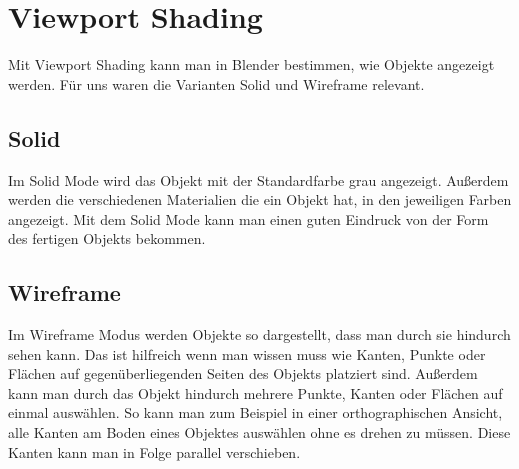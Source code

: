 \section{Viewport Shading}
Mit Viewport Shading kann man in Blender bestimmen, wie Objekte angezeigt werden. Für uns waren die Varianten Solid und Wireframe relevant.

\subsection{Solid}
Im Solid Mode wird das Objekt mit der Standardfarbe grau angezeigt.\citep{viewportshading:link} Außerdem werden die verschiedenen Materialien die ein Objekt
hat, in den jeweiligen Farben angezeigt. Mit dem Solid Mode kann man einen guten Eindruck von der Form des fertigen Objekts bekommen.

\subsection{Wireframe}
Im Wireframe Modus werden Objekte so dargestellt, dass man durch sie hindurch sehen kann.\citep{viewportshading:link}
Das ist hilfreich wenn man wissen muss wie Kanten, Punkte oder Flächen auf gegenüberliegenden Seiten des Objekts
platziert sind. Außerdem kann man durch das Objekt hindurch mehrere Punkte, Kanten oder Flächen auf einmal auswählen. So kann man zum Beispiel
in einer orthographischen Ansicht, alle Kanten am Boden eines Objektes auswählen ohne es drehen zu müssen. Diese Kanten kann
man in Folge parallel verschieben.
